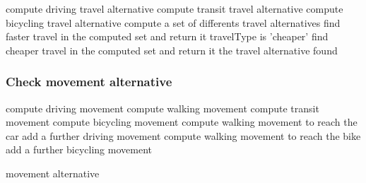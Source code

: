 \begin{algorithmic}

		
			\State 	compute driving travel alternative
			\State 	compute transit travel alternative
			\State 	compute bicycling travel alternative
			\State 	compute a set of differents travel alternatives
		\EndIf
				\State find faster travel in the computed set and return it
			\EndIf
			\If travelType is 'cheaper'
				\State find cheaper travel in the computed set and return it
			\EndIf
			\State \Return the travel alternative found
		\EndIf
	\EndFunction
\end{algorithmic}

\subsubsection{Check movement alternative}
\begin{algorithmic}

			\State compute driving movement
			\State compute walking movement
			\State compute transit movement
			\State compute bicycling movement
			\State compute walking movement to reach the car
			\State add a further driving movement
			\State compute walking movement to reach the bike
			\State add a further bicycling movement
		\EndIf
	
	
			\State \Return movement alternative
		\EndIf
	\EndFunction

\end{algorithmic}

